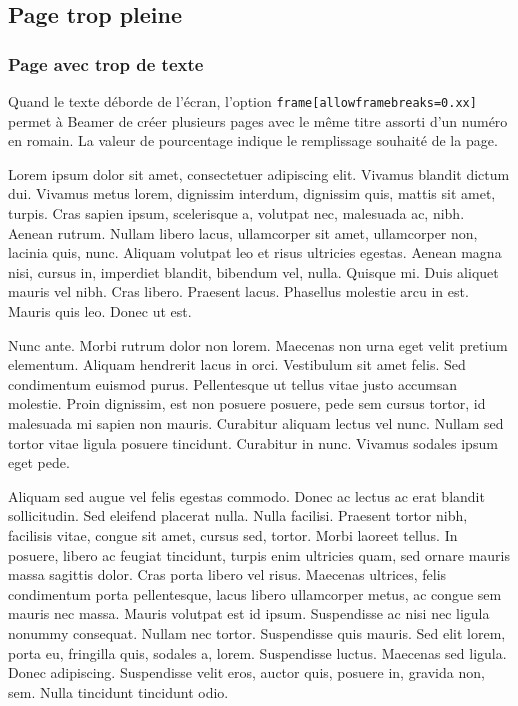 \documentclass[slidetop,11pt]{beamer}
\begin{document}
\subsection[trop-plein]{Page trop pleine}
\begin{frame}[allowframebreaks=0.85]
  \frametitle{Page avec trop de texte}
    \begin{beamerboxesrounded}[scheme=clair]{}
   Quand le texte déborde de l'écran, l'option \texttt{frame[allowframebreaks=0.xx]} permet à Beamer de créer plusieurs pages avec le même titre assorti d'un numéro en romain. La valeur de pourcentage indique le remplissage souhaité de la page.
   \end{beamerboxesrounded}
   \bigskip  

   Lorem ipsum dolor sit amet, consectetuer adipiscing elit. Vivamus blandit dictum dui. Vivamus metus lorem, dignissim interdum, dignissim quis, mattis sit amet, turpis. Cras sapien ipsum, scelerisque a, volutpat nec, malesuada ac, nibh. Aenean rutrum. Nullam libero lacus, ullamcorper sit amet, ullamcorper non, lacinia quis, nunc. Aliquam volutpat leo et risus ultricies egestas. Aenean magna nisi, cursus in, imperdiet blandit, bibendum vel, nulla. Quisque mi. Duis aliquet mauris vel nibh. Cras libero. Praesent lacus. Phasellus molestie arcu in est. Mauris quis leo. Donec ut est.

Nunc ante. Morbi rutrum dolor non lorem. Maecenas non urna eget velit pretium elementum. Aliquam hendrerit lacus in orci. Vestibulum sit amet felis. Sed condimentum euismod purus. Pellentesque ut tellus vitae justo accumsan molestie. Proin dignissim, est non posuere posuere, pede sem cursus tortor, id malesuada mi sapien non mauris. Curabitur aliquam lectus vel nunc. Nullam sed tortor vitae ligula posuere tincidunt. Curabitur in nunc. Vivamus sodales ipsum eget pede.

Aliquam sed augue vel felis egestas commodo. Donec ac lectus ac erat blandit sollicitudin. Sed eleifend placerat nulla. Nulla facilisi. Praesent tortor nibh, facilisis vitae, congue sit amet, cursus sed, tortor. Morbi laoreet tellus. In posuere, libero ac feugiat tincidunt, turpis enim ultricies quam, sed ornare mauris massa sagittis dolor. Cras porta libero vel risus. Maecenas ultrices, felis condimentum porta pellentesque, lacus libero ullamcorper metus, ac congue sem mauris nec massa. Mauris volutpat est id ipsum. Suspendisse ac nisi nec ligula nonummy consequat. Nullam nec tortor. Suspendisse quis mauris. Sed elit lorem, porta eu, fringilla quis, sodales a, lorem. Suspendisse luctus. Maecenas sed ligula. Donec adipiscing. Suspendisse velit eros, auctor quis, posuere in, gravida non, sem. Nulla tincidunt tincidunt odio. 
\end{frame}
 
\end{document}

